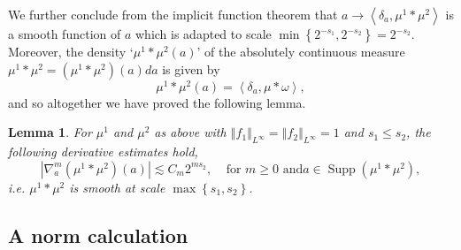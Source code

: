 \documentclass{amsart}%
\theoremstyle{plain}
\newtheorem{lemma}[theorem]{Lemma}
\numberwithin{equation}{section}
\begin{document}
We further conclude from the implicit function theorem that $a\rightarrow
\left\langle \delta_{a},\mu^{1}\ast\mu^{2}\right\rangle $ is a smooth function
of $a$ which is adapted to scale $\min\left\{  2^{-s_{1}},2^{-s_{2}}\right\}
=2^{-s_{2}}$. Moreover, the density `$\mu^{1}\ast\mu^{2}\left(  a\right)  $'
of the absolutely continuous measure $\mu^{1}\ast\mu^{2}=\left(  \mu^{1}%
\ast\mu^{2}\right)  \left(  a\right)  da$ is given by%
\begin{equation}
\mu^{1}\ast\mu^{2}\left(  a\right)  =\left\langle \delta_{a},\mu\ast
\omega\right\rangle ,\label{density}%
\end{equation}
and so altogether we have proved the following lemma.

\begin{lemma}
\label{scales}For $\mu^{1}$ and $\mu^{2}$ as above with $\left\Vert
f_{1}\right\Vert _{L^{\infty}}=\left\Vert f_{2}\right\Vert _{L^{\infty}}=1$
and $s_{1}\leq s_{2}$, the following derivative estimates hold,%
\[
\left\vert \nabla_{a}^{m}\left(  \mu^{1}\ast\mu^{2}\right)  \left(  a\right)
\right\vert \lesssim C_{m}2^{ms_{2}},\ \ \ \ \ \text{for }m\geq0\text{ and
}a\in\operatorname*{Supp}\left(  \mu^{1}\ast\mu^{2}\right)  ,
\]
i.e. $\mu^{1}\ast\mu^{2}$ is smooth at scale $\max\left\{  s_{1}%
,s_{2}\right\}  $.
\end{lemma}

\subsection{A norm calculation}
\end{document}

